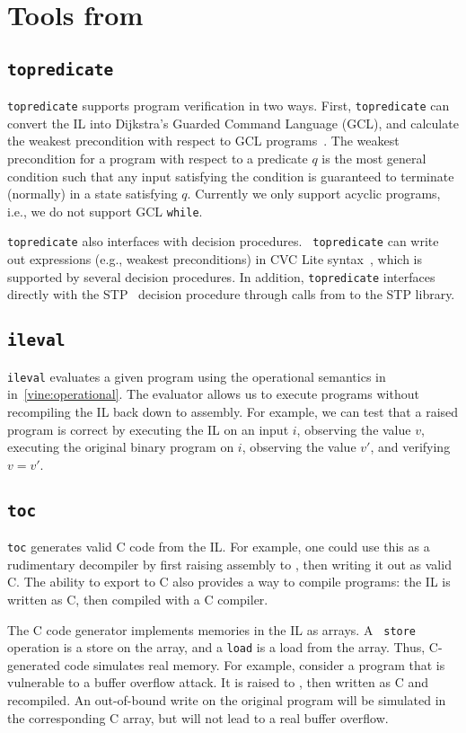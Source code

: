 \section{Tools from \bil}

\subsection{{\tt topredicate}}

{\tt topredicate} supports program verification in two ways. First,
{\tt topredicate} can convert the IL into Dijkstra's Guarded Command
Language (GCL), and calculate the weakest precondition with respect to
GCL programs~\cite{dijkstra:1976}. The weakest precondition for a
program with respect to a predicate $q$ is the most general condition
such that any input satisfying the condition is guaranteed to
terminate (normally) in a state satisfying $q$.  Currently we only
support acyclic programs, i.e., we do not support GCL {\tt while}.

{\tt topredicate} also interfaces with decision procedures.  {\tt
  topredicate} can write out expressions (e.g., weakest preconditions)
in CVC Lite syntax~\cite{cvclite}, which is supported by several
decision procedures. In addition, {\tt topredicate} interfaces
directly with the STP~\cite{ganesh:2007} decision procedure through
calls from \bap to the STP library.



\subsection{{\tt ileval}} 

{\tt ileval} evaluates a given \bil
program using the operational semantics in in~\ref{vine:operational}.
The evaluator allows us to execute programs without recompiling the IL
back down to assembly. For example, we can test that a raised program
is correct by executing the IL on an input $i$, observing the value $v$,
executing the original binary program on $i$, observing the value
$v'$, and verifying $v = v'$.

\subsection{{\tt toc}} 

{\tt toc} generates valid C code from the IL.  For example, one could
use this as a rudimentary decompiler by first raising assembly to
\bil, then writing it out as valid C.  The ability to export to C also
provides a way to compile \bil programs: the IL is written as C, then
compiled with a C compiler.

The C code generator implements memories in the IL as arrays.  A {\tt
  store} operation is a store on the array, and a {\tt load} is a load
from the array.  Thus, C-generated code simulates real memory.  For
example, consider a program that is vulnerable to a buffer overflow
attack. It is raised to \bil, then written as C and recompiled. An
out-of-bound write on the original program will be simulated in the
corresponding C array, but will not lead to a real buffer overflow.

